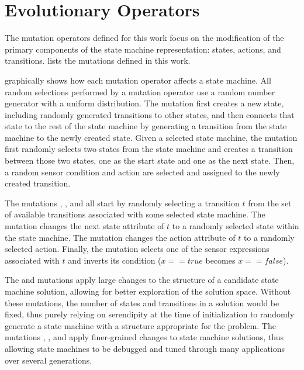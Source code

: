 \section{Evolutionary Operators}
\label{sec:evolutionary-operators}
The mutation operators defined for this work focus on the modification of the primary components of the state machine representation: states, actions, and transitions.   lists the mutations defined in this work.

 graphically shows how each mutation operator affects a state machine.  All random selections performed by a mutation operator use a random number generator with a uniform distribution.  The  mutation first creates a new state, including randomly generated transitions to other states, and then connects that state to the rest of the state machine by generating a transition from the state machine to the newly created state.  Given a selected state machine, the  mutation first randomly selects two states from the state machine and creates a transition between those two states, one as the start state and one as the next state.  Then, a random sensor condition and action are selected and assigned to the newly created transition.

The mutations , , and  all start by randomly selecting a transition $t$ from the set of available transitions associated with some selected state machine.  The  mutation changes the next state attribute of $t$ to a randomly selected state within the state machine.  The  mutation changes the action attribute of $t$ to a randomly selected action.  Finally, the  mutation selects one of the sensor expressions associated with $t$ and inverts its condition (\eg $x==true$ becomes $x==false$).

The  and  mutations apply large changes to the structure of a candidate state machine solution, allowing for better exploration of the solution space.  Without these mutations, the number of states and transitions in a solution would be fixed, thus purely relying on serendipity at the time of initialization to randomly generate a state machine with a structure appropriate for the problem.  The mutations , , and  apply finer-grained changes to state machine solutions, thus allowing state machines to be debugged and tuned through many applications over several generations.

